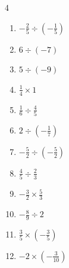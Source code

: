 \begin{multicols}{4}
\begin{enumerate}
  \item $\displaystyle -\frac{2}{5}\div{}\left(-\frac{1}{5}\right)$

        \phantom{$\displaystyle =2$}

  \item $\displaystyle 6\div{}\left(-7\right)$


  \item $\displaystyle 5\div{}\left(-9\right)$


  \item $\displaystyle \frac{1}{4}\times{}1$


  \item $\displaystyle \frac{1}{6}\div{}\frac{4}{5}$


  \item $\displaystyle 2\div{}\left(-\frac{1}{7}\right)$

        \phantom{$\displaystyle =-14$}

\columnbreak %

  \item $\displaystyle -\frac{5}{2}\div{}\left(-\frac{5}{2}\right)$

        \phantom{$\displaystyle =1$}

  \item $\displaystyle \frac{4}{5}\div{}\frac{2}{3}$


  \item $\displaystyle -\frac{3}{2}\times{}\frac{5}{3}$


  \item $\displaystyle -\frac{8}{9}\div{}2$


  \item $\displaystyle \frac{3}{5}\times{}\left(-\frac{3}{5}\right)$


  \item $\displaystyle -2\times{}\left(-\frac{3}{10}\right)$


\end{enumerate}
\end{multicols}
